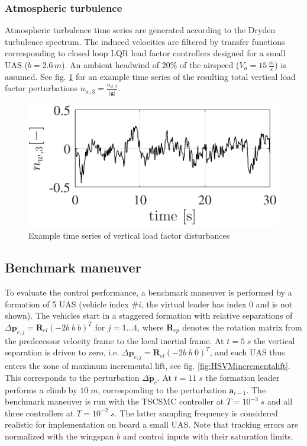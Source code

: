 \documentclass{ifacconf}
\providecommand{\mbf}[1]{\mathbf{#1}}
\newcommand{\idxFollower}{{\ensuremath{i} }}
\newcommand{\idxPredecessor}{{\ensuremath{i-1} }}
\begin{document}
\subsubsection{\textbf{Atmospheric turbulence}}
Atmospheric turbulence time series are generated according to the Dryden turbulence spectrum. The induced velocities are filtered by transfer functions corresponding to closed loop LQR load factor controllers designed for a small UAS ($b=2.6 \, m$). An ambient headwind of 20\% of the airspeed ($V_a = 15 \, \frac{m}{s}$) is assumed. See fig. \ref{fig:nwztimeseries} for an example time series of the resulting total vertical load factor perturbations $n_{w,3} = \frac{a_{w,3}}{|\mbf{g}|}$.
\begin{figure}
\begin{center}
\includegraphics[scale=1]{nwz-timeseries}    %
\caption{ Example time series of vertical load factor disturbances}
\label{fig:nwztimeseries}
\end{center}
\end{figure}
\subsection{{Benchmark maneuver}}
To evaluate the control performance, a benchmark maneuver is performed by a formation of 5 UAS (vehicle index $\#\idxFollower$, the virtual leader has index 0 and is not shown). The vehicles start in a staggered formation with relative separations of $\Delta \mbf{p}_{c,j} = \mbf{R}_{el} (-2b \; b \; b)^T$ for $j=1...4$, where $\mbf{R}_{ep}$ denotes the rotation matrix from the predecessor velocity frame to the local inertial frame. At $t=5 \; s$ the vertical separation is driven to zero, i.e. $\Delta \mbf{p}_{c,j} = \mbf{R}_{el}(-2b \; b \; 0)^T$, and each UAS thus enters the zone of maximum incremental lift, see fig. \ref{fig:HSVMincrementalift}. This corresponds to the perturbation $\Delta \ddot{\mbf{p}}_c$. At $t=11 \;s$ the formation leader performs a climb by $10 \; m$, corresponding to the perturbation $\mbf{a}_{\idxPredecessor}$.
The benchmark maneuver is run with the TSCSMC controller at $T=10^{-3} \; s$ and all three controllers at $T=10^{-2} \; s$. The latter sampling frequency is considered realistic for implementation on board a small UAS. Note that tracking errors are normalized with the wingspan $b$ and control inputs with their saturation limits.\\
\end{document}

